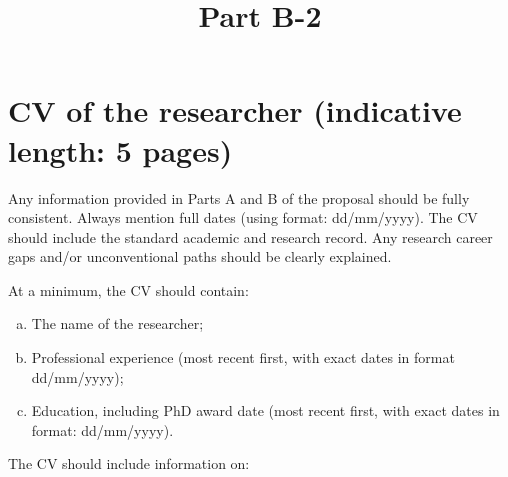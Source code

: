 \documentclass[11pt,draftproposal]{msca-pf-2022}
\title{Part B-2}
\author{}
\date{}
\begin{document}
\maketitle

\section{CV of the researcher (indicative length: 5 pages)}

Any information provided in Parts A and B of the proposal should be fully consistent.
Always mention full dates (using format: dd/mm/yyyy). The CV should include the
standard academic and research record. Any research career gaps and/or unconventional
paths should be clearly explained.

At a minimum, the CV should contain:

\begin{enumerate}[a)]
    \item The name of the researcher;
    \item Professional experience (most recent first, with exact dates in format
    dd/mm/yyyy);
    \item Education, including PhD award date (most recent first, with exact
    dates in format: dd/mm/yyyy).
\end{enumerate}

The CV should include information on:
\end{document}
